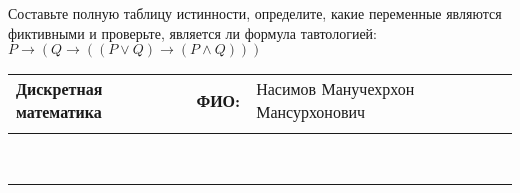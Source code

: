 \documentclass[10pt]{exam}
\newcommand{\class}{Дискретная математика}
\newcommand{\examdate}{}
\begin{document}
\begin{questions}
\begin{enumerate}[a)]
\end{enumerate}\question Составьте полную таблицу истинности, определите, какие переменные являются фиктивными и проверьте, является ли формула тавтологией:
$ P \rightarrow (Q \rightarrow ((P \lor Q) \rightarrow (P \land Q)))$

\end{questions}
\newpage
\begin{flushright}
\begin{tabular}{p{2.8in} r l}
\textbf{\class} & \textbf{ФИО:} &Насимов Манучехрхон Мансурхонович
\\

\textbf{\examdate} &&\\
\end{tabular}\\
\end{flushright}
\rule[1ex]{\textwidth}{.1pt}
\end{document}
